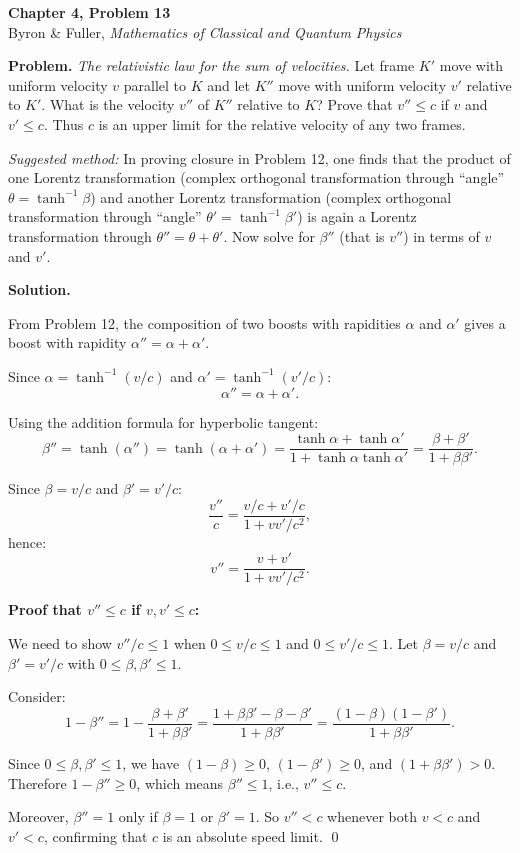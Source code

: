 \documentclass[12pt]{article}
\begin{document}
\begin{center}
{\Large\bfseries Chapter 4, Problem 13}\\[6pt]
Byron \& Fuller, \textit{Mathematics of Classical and Quantum Physics}
\end{center}

\bigskip

\textbf{Problem.} \textit{The relativistic law for the sum of velocities.} Let frame $K'$ move with uniform velocity $v$ parallel to $K$ and let $K''$ move with uniform velocity $v'$ relative to $K'$. What is the velocity $v''$ of $K''$ relative to $K$? Prove that $v'' \leq c$ if $v$ and $v' \leq c$. Thus $c$ is an upper limit for the relative velocity of any two frames.

\textit{Suggested method:} In proving closure in Problem 12, one finds that the product of one Lorentz transformation (complex orthogonal transformation through ``angle'' $\theta = \tanh^{-1}\beta$) and another Lorentz transformation (complex orthogonal transformation through ``angle'' $\theta' = \tanh^{-1}\beta'$) is again a Lorentz transformation through $\theta'' = \theta + \theta'$. Now solve for $\beta''$ (that is $v''$) in terms of $v$ and $v'$.

\bigskip
\textbf{Solution.}

From Problem 12, the composition of two boosts with rapidities $\alpha$ and $\alpha'$ gives a boost with rapidity $\alpha'' = \alpha + \alpha'$.

Since $\alpha = \tanh^{-1}(v/c)$ and $\alpha' = \tanh^{-1}(v'/c)$:
\[
\alpha'' = \alpha + \alpha'.
\]

Using the addition formula for hyperbolic tangent:
\[
\beta'' = \tanh(\alpha'') = \tanh(\alpha + \alpha') = \frac{\tanh\alpha + \tanh\alpha'}{1 + \tanh\alpha\tanh\alpha'} = \frac{\beta + \beta'}{1 + \beta\beta'}.
\]

Since $\beta = v/c$ and $\beta' = v'/c$:
\[
\frac{v''}{c} = \frac{v/c + v'/c}{1 + vv'/c^2},
\]
hence:
\[
\boxed{v'' = \frac{v + v'}{1 + vv'/c^2}}.
\]

\textbf{Proof that $v'' \leq c$ if $v, v' \leq c$:}

We need to show $v''/c \leq 1$ when $0 \leq v/c \leq 1$ and $0 \leq v'/c \leq 1$. Let $\beta = v/c$ and $\beta' = v'/c$ with $0 \leq \beta, \beta' \leq 1$.

Consider:
\[
1 - \beta'' = 1 - \frac{\beta + \beta'}{1 + \beta\beta'} = \frac{1 + \beta\beta' - \beta - \beta'}{1 + \beta\beta'} = \frac{(1-\beta)(1-\beta')}{1 + \beta\beta'}.
\]

Since $0 \leq \beta, \beta' \leq 1$, we have $(1-\beta) \geq 0$, $(1-\beta') \geq 0$, and $(1+\beta\beta') > 0$. Therefore $1 - \beta'' \geq 0$, which means $\beta'' \leq 1$, i.e., $v'' \leq c$.

Moreover, $\beta'' = 1$ only if $\beta = 1$ or $\beta' = 1$. So $v'' < c$ whenever both $v < c$ and $v' < c$, confirming that $c$ is an absolute speed limit. \qed
\end{document}
